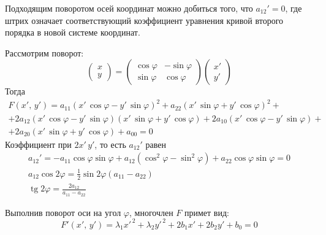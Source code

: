 \begin{lemma}
  Подходящим поворотом осей координат можно добиться того, что $a_{12}'= 0$, где штрих означает соответствующий коэффициент уравнения кривой второго порядка в новой системе координат.
\end{lemma}
\begin{Proof}
  Рассмотрим поворот: 
  $$
  \begin{pmatrix} x \\ y \end{pmatrix} = 
  \begin{pmatrix}
    \cos \varphi & -\sin \varphi \\
    \sin \varphi & \cos \varphi
  \end{pmatrix} \begin{pmatrix} x' \\ y' \end{pmatrix}
  $$
  Тогда 
  \begin{gather*} F(x', \, y') = a_{11}(x'\, \cos \varphi - y' \, \sin \varphi)^2 + a_{22} (x' \, \sin \varphi + y'\, \cos \varphi)^2 + \\ + 2a_{12}(x' \, \cos \varphi - y' \, \sin \varphi)(x' \, \sin \varphi + y'\, \cos \varphi)+
  2a_{10}(x'\, \cos \varphi - y' \, \sin \varphi) + \\ + 2a_{20}(x' \, \sin \varphi + y' \, \cos \varphi) + a_{00} = 0 
  \end{gather*}
  Коэффициент при $2x'\, y'$, то есть $a_{12}'$ равен
  \begin{gather*}
    a_{12}' = -a_{11}\cos \varphi \sin \varphi + a_{12}(\cos^2 \varphi - \sin^2 \varphi) + a_{22}\cos \varphi \sin \varphi  = 0 \\
    a_{12}\cos 2\varphi = \frac{1}{2} \sin 2\varphi (a_{11} - a_{22}) \\
    \operatorname{tg} 2 \varphi = \frac{2a_{12}}{a_{11} - a_{22}} 
  \end{gather*}
\end{Proof}
Выполнив поворот оси на угол $\varphi$, многочлен $F$ примет вид:
\begin{equation}
  \label{eq:fig_del12}
  F'(x', \, y') = \lambda_1 x'^{\, 2} + \lambda_2 y'^{\, 2} + 2b_1x' + 2b_2y' + b_0 = 0
\end{equation}
